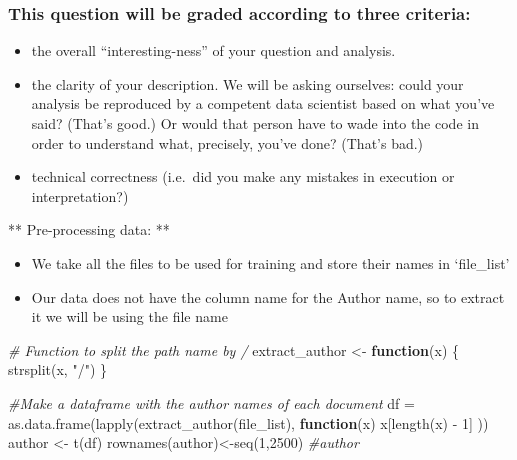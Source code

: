 \documentclass[
  12pt,
]{article}
\newenvironment{Shaded}{\begin{snugshade}}{\end{snugshade}}
\newcommand{\CommentTok}[1]{\textcolor[rgb]{0.56,0.35,0.01}{\textit{#1}}}
\newcommand{\ControlFlowTok}[1]{\textcolor[rgb]{0.13,0.29,0.53}{\textbf{#1}}}
\newcommand{\DecValTok}[1]{\textcolor[rgb]{0.00,0.00,0.81}{#1}}
\newcommand{\FunctionTok}[1]{\textcolor[rgb]{0.00,0.00,0.00}{#1}}
\newcommand{\NormalTok}[1]{#1}
\newcommand{\OtherTok}[1]{\textcolor[rgb]{0.56,0.35,0.01}{#1}}
\newcommand{\SpecialCharTok}[1]{\textcolor[rgb]{0.00,0.00,0.00}{#1}}
\newcommand{\StringTok}[1]{\textcolor[rgb]{0.31,0.60,0.02}{#1}}
\begin{document}
\hypertarget{this-question-will-be-graded-according-to-three-criteria}{%
\subsubsection{This question will be graded according to three
criteria:}\label{this-question-will-be-graded-according-to-three-criteria}}

\begin{itemize}
\item
  the overall ``interesting-ness'' of your question and analysis.
\item
  the clarity of your description. We will be asking ourselves: could
  your analysis be reproduced by a competent data scientist based on
  what you've said? (That's good.) Or would that person have to wade
  into the code in order to understand what, precisely, you've done?
  (That's bad.)
\item
  technical correctness (i.e.~did you make any mistakes in execution or
  interpretation?)
\end{itemize}

** Pre-processing data: **

\begin{itemize}
\item
  We take all the files to be used for training and store their names in
  `file\_list'
\item
  Our data does not have the column name for the Author name, so to
  extract it we will be using the file name
\end{itemize}

\begin{Shaded}
\begin{Highlighting}[]
\CommentTok{\# Function to split the path name by \textquotesingle{}/\textquotesingle{}}
\NormalTok{extract\_author }\OtherTok{\textless{}{-}} \ControlFlowTok{function}\NormalTok{(x) \{}
  \FunctionTok{strsplit}\NormalTok{(x, }\StringTok{"/"}\NormalTok{)}
\NormalTok{\}}

\CommentTok{\#Make a dataframe with the author names of each document}
\NormalTok{df }\OtherTok{=} \FunctionTok{as.data.frame}\NormalTok{(}\FunctionTok{lapply}\NormalTok{(}\FunctionTok{extract\_author}\NormalTok{(file\_list), }\ControlFlowTok{function}\NormalTok{(x) x[}\FunctionTok{length}\NormalTok{(x) }\SpecialCharTok{{-}} \DecValTok{1}\NormalTok{] ))}
\NormalTok{author }\OtherTok{\textless{}{-}} \FunctionTok{t}\NormalTok{(df)}
\FunctionTok{rownames}\NormalTok{(author)}\OtherTok{\textless{}{-}}\FunctionTok{seq}\NormalTok{(}\DecValTok{1}\NormalTok{,}\DecValTok{2500}\NormalTok{)}
\CommentTok{\#author}
\end{Highlighting}
\end{Shaded}
\end{document}
